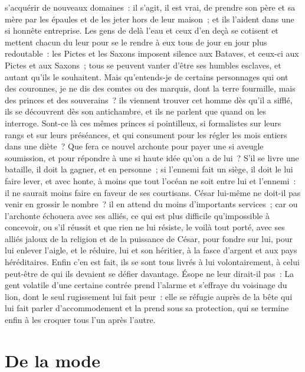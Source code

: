 \documentclass[french,twoside]{book} %
\newcommand\chapteropen{} %
\newcommand\chapterclose{} %
\begin{document}
s’acquérir de nouveaux domaines : il s’agit, il est vrai, de prendre son père et sa mère par les épaules et de les jeter hors de leur maison ; et ils l’aident dans une si honnête entreprise. Les gens de delà l’eau et ceux d’en deçà se cotisent et mettent chacun du leur pour se le rendre à eux tous de jour en jour plus redoutable : les Pictes et les Saxons imposent silence aux Bataves, et ceux-ci aux Pictes et aux Saxons ; tous se peuvent vanter d’être ses humbles esclaves, et autant qu’ils le souhaitent. Mais qu’entends-je de certains personnages qui ont des couronnes, je ne dis des comtes ou des marquis, dont la terre fourmille, mais des princes et des souverains ? ils viennent trouver cet homme dès qu’il a sifflé, ils se découvrent dès son antichambre, et ils ne parlent que quand on les interroge. Sont-ce là ces mêmes princes si pointilleux, si formalistes sur leurs rangs et sur leurs préséances, et qui consument pour les régler les mois entiers dans une diète ? Que fera ce nouvel archonte pour payer une si aveugle soumission, et pour répondre à une si haute idée qu’on a de lui ? S'il se livre une bataille, il doit la gagner, et en personne ; si l’ennemi fait un siège, il doit le lui faire lever, et avec honte, à moins que tout l’océan ne soit entre lui et l’ennemi : il ne saurait moins faire en faveur de ses courtisans. César lui-même ne doit-il pas venir en grossir le nombre ? il en attend du moins d’importants services ; car ou l’archonte échouera avec ses alliés, ce qui est plus difficile qu’impossible à concevoir, ou s’il réussit et que rien ne lui résiste, le voilà tout porté, avec ses alliés jaloux de la religion et de la puissance de César, pour fondre sur lui, pour lui enlever l’aigle, et le réduire, lui et son héritier, à la fasce d’argent et aux pays héréditaires. Enfin c’en est fait, ils se sont tous livrés à lui volontairement, à celui peut-être de qui ils devaient se défier davantage. Ésope ne leur dirait-il pas : La gent volatile d’une certaine contrée prend l’alarme et s’effraye du voisinage du lion, dont le seul rugissement lui fait peur : elle se réfugie auprès de la bête qui lui fait parler d’accommodement et la prend sous sa protection, qui se termine enfin à les croquer tous l’un après l’autre.
\chapterclose


\chapteropen
\chapter[{De la mode}]{De la mode}
\label{lb-mode}\renewcommand{\leftmark}{De la mode}
\end{document}
